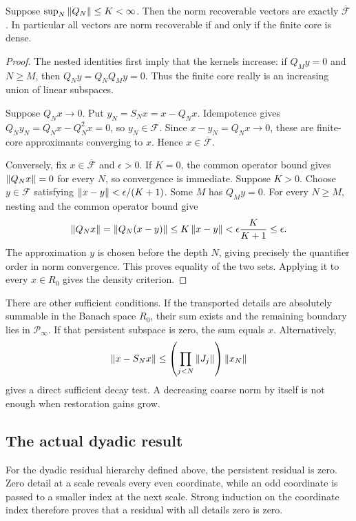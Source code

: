 \begin{KStheorem}\label{KS:KS27}
Suppose \(\sup_N\left\lVert Q_N\right\rVert\le K<\infty\). Then the norm recoverable vectors are exactly \(\overline{\mathcal F}\). In particular all vectors are norm recoverable if and only if the finite core is dense.
\end{KStheorem}
\begin{proof}
The nested identities first imply that the kernels increase: if $Q_My=0$ and $N\ge M$, then $Q_Ny=Q_NQ_My=0$. Thus the finite core really is an increasing union of linear subspaces.

Suppose $Q_Nx\to0$. Put $y_N=S_Nx=x-Q_Nx$. Idempotence gives $Q_Ny_N=Q_Nx-Q_N^2x=0$, so $y_N\in\mathcal F$. Since $x-y_N=Q_Nx\to0$, these are finite-core approximants converging to $x$. Hence $x\in\overline{\mathcal F}$.

Conversely, fix $x\in\overline{\mathcal F}$ and $\epsilon>0$. If $K=0$, the common operator bound gives $\left\lVert Q_Nx\right\rVert=0$ for every $N$, so convergence is immediate. Suppose $K>0$. Choose $y\in\mathcal F$ satisfying $\left\lVert x-y\right\rVert<\epsilon/(K+1)$. Some $M$ has $Q_My=0$. For every $N\ge M$, nesting and the common operator bound give
\[
 \left\lVert Q_Nx\right\rVert=\left\lVert Q_N(x-y)\right\rVert\le K\left\lVert x-y\right\rVert
 <\epsilon\frac{K}{K+1}\le\epsilon.
\]
The approximation $y$ is chosen before the depth $N$, giving precisely the quantifier order in norm convergence. This proves equality of the two sets. Applying it to every $x\in R_0$ gives the density criterion.
\end{proof}
There are other sufficient conditions. If the transported details are absolutely summable in the Banach space \(R_0\), their sum exists and the remaining boundary lies in \(\mathcal P_\infty\). If that persistent subspace is zero, the sum equals \(x\). Alternatively,
\[
 \left\lVert x-S_Nx\right\rVert\le\left(\prod_{j<N}\left\lVert J_j\right\rVert\right)\left\lVert x_N\right\rVert
\]
gives a direct sufficient decay test. A decreasing coarse norm by itself is not enough when restoration gains grow.

\subsection{The actual dyadic result}
For the dyadic residual hierarchy defined above, the persistent residual is zero. Zero detail at a scale reveals every even coordinate, while an odd coordinate is passed to a smaller index at the next scale. Strong induction on the coordinate index therefore proves that a residual with all details zero is zero.

